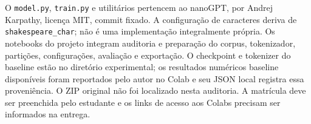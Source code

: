 \documentclass[conference]{IEEEtran}
\begin{document}
O \texttt{model.py}, \texttt{train.py} e utilitários pertencem ao nanoGPT, por Andrej Karpathy, licença MIT, commit fixado. A configuração de caracteres deriva de \texttt{shakespeare\_char}; não é uma implementação integralmente própria. Os notebooks do projeto integram auditoria e preparação do corpus, tokenizador, partições, configurações, avaliação e exportação. O checkpoint e tokenizer do baseline estão no diretório experimental; os resultados numéricos baseline disponíveis foram reportados pelo autor no Colab e seu JSON local registra essa proveniência. O ZIP original não foi localizado nesta auditoria. A matrícula deve ser preenchida pelo estudante e os links de acesso aos Colabs precisam ser informados na entrega.



\end{document}
